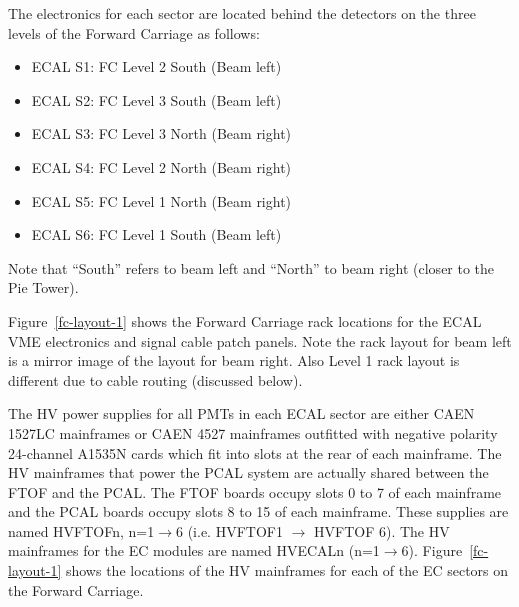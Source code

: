 \documentclass[letterpaper,10pt]{article}
\begin{document}
The electronics for each sector are located behind the detectors on the three levels of the Forward 
Carriage as follows:

\vskip 0.5cm

\begin{minipage}{0.5\textwidth}
\begin{itemize}
\item ECAL S1: FC Level 2 South (Beam left)
\item ECAL S2: FC Level 3 South (Beam left)
\item ECAL S3: FC Level 3 North (Beam right)
\end{itemize}
\end{minipage}
\begin{minipage}{0.5\textwidth}
\begin{itemize}
\item ECAL S4: FC Level 2 North (Beam right)
\item ECAL S5: FC Level 1 North (Beam right)
\item ECAL S6: FC Level 1 South (Beam left)
\end{itemize}
\end{minipage}

\vskip 0.5cm

Note that ``South'' refers to beam left and ``North'' to beam right (closer to the Pie Tower).

Figure~\ref{fc-layout-1} shows the Forward Carriage rack locations for the ECAL VME electronics and signal cable patch 
panels.  Note the rack layout for beam left is a mirror image of the layout for beam right.  Also Level 1 rack layout
is different due to cable routing (discussed below).

The HV power supplies for all PMTs in each ECAL sector are either CAEN 1527LC mainframes or CAEN 4527 mainframes 
outfitted with negative polarity 24-channel A1535N cards which fit into slots at the rear of each
mainframe. The HV mainframes that power the PCAL 
system are actually shared between the FTOF and the PCAL. The FTOF boards occupy slots 0 to 7 of each 
mainframe and the PCAL boards occupy slots 8 to 15 of each mainframe. These supplies are named HVFTOFn, 
n=1$\to$6 (i.e. HVFTOF1 $\to$ HVFTOF 6). The HV mainframes for the EC modules are named HVECALn (n=1$\to$6).
Figure~\ref{fc-layout-1} shows the locations of the HV mainframes for each of the EC sectors on the Forward Carriage.
\end{document}
